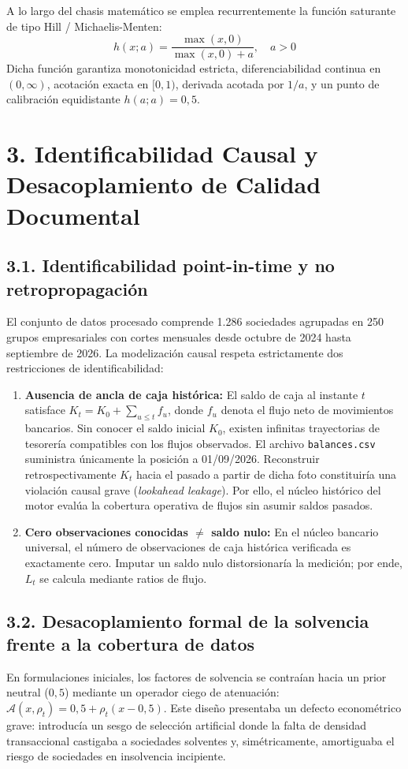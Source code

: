 \documentclass[10pt,a4paper]{article}
\begin{document}
A lo largo del chasis matemático se emplea recurrentemente la función saturante de tipo Hill / Michaelis-Menten:
\[
h(x; a) = \frac{\max(x, 0)}{\max(x, 0) + a}, \quad a > 0
\]
Dicha función garantiza monotonicidad estricta, diferenciabilidad continua en $(0, \infty)$, acotación exacta en $[0, 1)$, derivada acotada por $1/a$, y un punto de calibración equidistante $h(a; a) = 0{,}5$.

\section*{3. Identificabilidad Causal y Desacoplamiento de Calidad Documental}

\subsection*{3.1. Identificabilidad point-in-time y no retropropagación}
El conjunto de datos procesado comprende 1.286 sociedades agrupadas en 250 grupos empresariales con cortes mensuales desde octubre de 2024 hasta septiembre de 2026. La modelización causal respeta estrictamente dos restricciones de identificabilidad:
\begin{enumerate}[leftmargin=*, noitemsep]
  \item \textbf{Ausencia de ancla de caja histórica:} El saldo de caja al instante $t$ satisface $K_t = K_0 + \sum_{u \leq t} f_u$, donde $f_u$ denota el flujo neto de movimientos bancarios. Sin conocer el saldo inicial $K_0$, existen infinitas trayectorias de tesorería compatibles con los flujos observados. El archivo \texttt{balances.csv} suministra únicamente la posición a 01/09/2026. Reconstruir retrospectivamente $K_t$ hacia el pasado a partir de dicha foto constituiría una violación causal grave (\emph{lookahead leakage}). Por ello, el núcleo histórico del motor evalúa la cobertura operativa de flujos sin asumir saldos pasados.
  \item \textbf{Cero observaciones conocidas $\neq$ saldo nulo:} En el núcleo bancario universal, el número de observaciones de caja histórica verificada es exactamente cero. Imputar un saldo nulo distorsionaría la medición; por ende, $L_t$ se calcula mediante ratios de flujo.
\end{enumerate}

\subsection*{3.2. Desacoplamiento formal de la solvencia frente a la cobertura de datos}
En formulaciones iniciales, los factores de solvencia se contraían hacia un prior neutral ($0{,}5$) mediante un operador ciego de atenuación: $\mathcal{A}(x, \rho_t) = 0{,}5 + \rho_t (x - 0{,}5)$. Este diseño presentaba un defecto econométrico grave: introducía un sesgo de selección artificial donde la falta de densidad transaccional castigaba a sociedades solventes y, simétricamente, amortiguaba el riesgo de sociedades en insolvencia incipiente.
\end{document}
